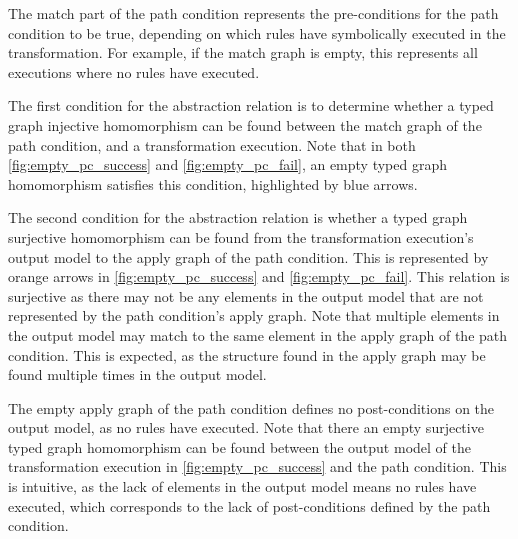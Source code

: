 

The match part of the path condition represents the pre-conditions for the path condition to be true, depending on which rules have symbolically executed in the transformation. For example, if the match graph is empty, this represents all executions where no rules have executed. 

The first condition for the abstraction relation is to determine whether a typed graph injective homomorphism can be found between the match graph of the path condition, and a transformation execution. Note that in both \cref{fig:empty_pc_success} and \cref{fig:empty_pc_fail}, an empty typed graph homomorphism satisfies this condition, highlighted by blue arrows.


The second condition for the abstraction relation is whether a typed graph surjective homomorphism can be found from the transformation execution's output model to the apply graph of the path condition. This is represented by orange arrows in \cref{fig:empty_pc_success} and \cref{fig:empty_pc_fail}. This relation is surjective as there may not be any elements in the output model that are not represented by the path condition's apply graph. Note that multiple elements in the output model may match to the same element in the apply graph of the path condition. This is expected, as the structure found in the apply graph may be found multiple times in the output model.


The empty apply graph of the path condition defines no post-conditions on the output model, as no rules have executed. Note that there an empty surjective typed graph homomorphism can be found between the output model of the transformation execution in \cref{fig:empty_pc_success} and the path condition. This is intuitive, as the lack of elements in the output model means no rules have executed, which corresponds to the lack of post-conditions defined by the path condition.


